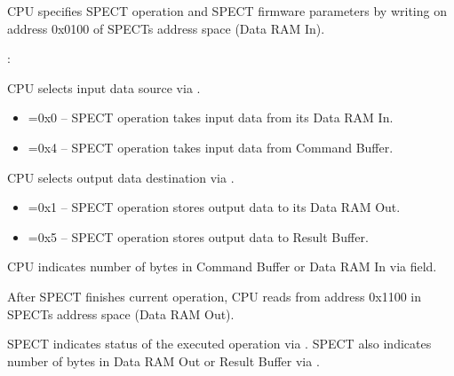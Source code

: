 CPU specifies SPECT operation and SPECT firmware parameters by writing\linebreak
{} on address 0x0100 of SPECTs address space (Data RAM In).

\vspace{.3cm}
:



CPU selects input data source via .
\begin{itemize}
    \item {}=0x0 -- SPECT operation takes input data from its Data RAM In.
    \item {}=0x4 -- SPECT operation takes input data from Command Buffer.
\end{itemize}

CPU selects output data destination via .
\begin{itemize}
    \item {}=0x1 -- SPECT operation stores output data to its Data RAM Out.
    \item {}=0x5 -- SPECT operation stores output data to Result Buffer.
\end{itemize}

CPU indicates number of bytes in Command Buffer or Data RAM In via \linebreak
{} field.

After SPECT finishes current operation, CPU reads  from address \linebreak
0x1100 in SPECTs address space (Data RAM Out).

\pagebreak
{}



SPECT indicates status of the executed operation via . SPECT also
indicates number of bytes in Data RAM Out or Result Buffer via \linebreak {}.


